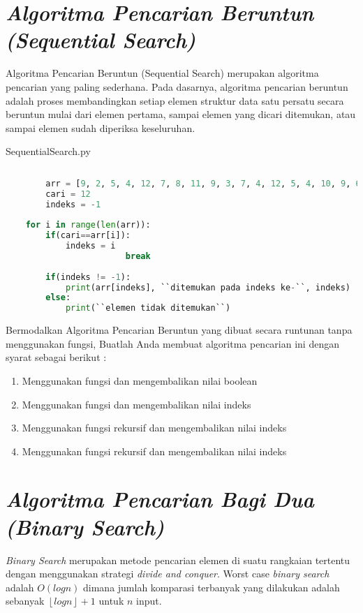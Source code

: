 \section{\textit{Algoritma Pencarian Beruntun (Sequential Search)}}
Algoritma Pencarian Beruntun (Sequential Search) merupakan algoritma pencarian yang paling sederhana. Pada dasarnya, algoritma pencarian beruntun adalah proses membandingkan setiap elemen struktur data satu persatu secara beruntun mulai dari elemen pertama, sampai elemen yang dicari ditemukan, atau sampai elemen sudah diperiksa keseluruhan.


\begin{listprog}{SequentialSearch.py}
	\label{lst:seqSearch}
	\begin{lstlisting}[language=Python]
	
		arr = [9, 2, 5, 4, 12, 7, 8, 11, 9, 3, 7, 4, 12, 5, 4, 10, 9, 6, 9, 4]
		cari = 12
		indeks = -1
		
    for i in range(len(arr)):
        if(cari==arr[i]):
            indeks = i
						break
    
		if(indeks != -1):
			print(arr[indeks], ``ditemukan pada indeks ke-``, indeks)
		else:
			print(``elemen tidak ditemukan``)
	\end{lstlisting}
\end{listprog}


Bermodalkan Algoritma Pencarian Beruntun yang dibuat secara runtunan tanpa menggunakan fungsi, Buatlah Anda membuat algoritma pencarian ini dengan syarat sebagai berikut : 
\begin{enumerate}
\item{Menggunakan fungsi dan mengembalikan nilai boolean}
\item{Menggunakan fungsi dan mengembalikan nilai indeks}
\item{Menggunakan fungsi rekursif dan mengembalikan nilai indeks}
\item{Menggunakan fungsi rekursif dan mengembalikan nilai indeks}
\end{enumerate}


\pagebreak
\section{\textit{Algoritma Pencarian Bagi Dua (Binary Search)}}
\textit{Binary Search} merupakan metode pencarian elemen di suatu rangkaian tertentu dengan menggunakan strategi \textit{divide and conquer}. Worst case \textit{binary search} adalah $O(log n)$ dimana jumlah komparasi terbanyak yang dilakukan adalah sebanyak $\left\lfloor log n \right\rfloor + 1$ untuk $n$ input.

